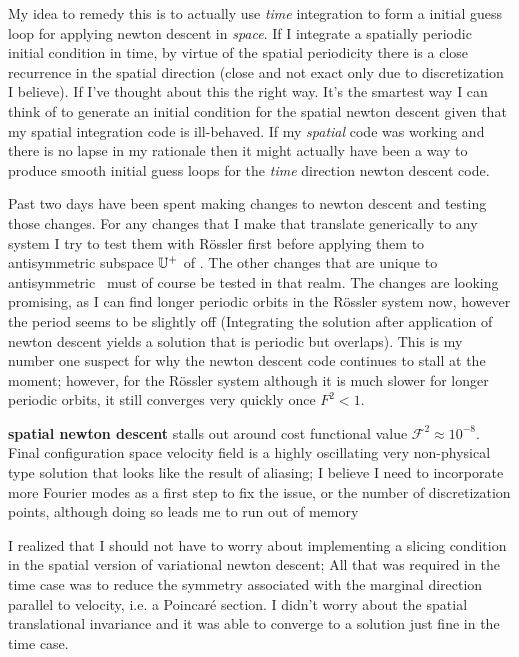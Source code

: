 My idea to remedy this is to actually use \emph{time} integration to form a initial guess loop for
applying {newton descent} in \emph{space}. If I integrate a spatially periodic initial condition in time,
by virtue of the spatial periodicity there is a close recurrence in the spatial direction
(close and not exact only due to discretization I believe). If I've thought about this the right way.
It's the smartest way I can think of to generate an initial condition for the spatial {newton descent}
 given that my spatial integration code is ill-behaved. If my \emph{spatial} code was
working and there is no lapse in my rationale then it might actually have been a way to produce smooth
initial guess loops for the \emph{time} direction {newton descent} code.

Past two days have been spent making changes to {newton descent} and testing
those changes. For any changes that I make that translate generically to
any system I try to test them with R\"ossler first before applying them
to antisymmetric subspace $\mathbb{U}^+$ of \KS. The other changes that are
unique to antisymmetric \KS\ must of course be tested in that realm. The
changes are looking promising, as I can find longer periodic orbits in
the R\"ossler system now, however the period seems to be slightly off
(Integrating the solution after application of {newton descent} yields a
solution that is periodic but overlaps). This is my number one suspect
for why the {newton descent} code continues to stall at the moment; however,
for the R\"ossler system although it is much slower for longer periodic
orbits, it still converges very quickly once $F^2 < 1$.

{\bf spatial {newton descent}} stalls out around
cost functional value $\mathcal{F}^2 \approx 10^{-8}$. Final configuration
space velocity field is a highly oscillating very non-physical
 type solution that looks like the result of aliasing; I believe I need
to incorporate more Fourier modes as a first step to fix the
 issue, or the number of discretization points, although doing so leads me
to run out of memory

I realized that I should not have to worry about implementing a slicing condition
in the spatial version of variational {newton descent}; All that was required in the
time case was to reduce the symmetry associated with the marginal direction parallel to
velocity, i.e. a Poincar\'e section. I didn't worry about the spatial translational invariance
and it was able to converge to a solution just fine in the time case.

